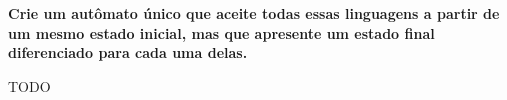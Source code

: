
\textbf{Crie um autômato único que aceite todas essas linguagens a partir de um mesmo estado inicial, mas que apresente um estado final diferenciado para cada uma delas.}

TODO
